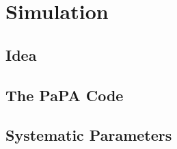\chapter{Simulation}
\label{sec:sim}


\section{Idea}
\label{sec:sim_idea}


\section{The PaPA Code}
\label{sec:papa}


\section{Systematic Parameters}
\label{sec:systematics}
